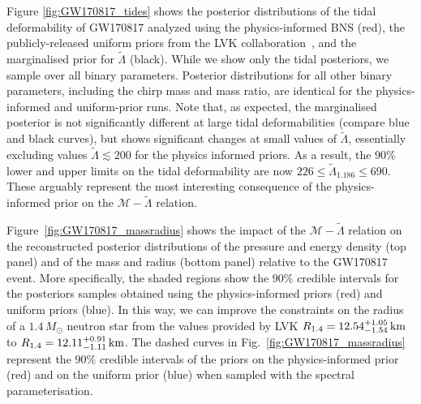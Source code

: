 \documentclass[twocolumn,linenumbers]{aastex631}
\begin{document}
Figure \ref{fig:GW170817_tides} shows the posterior distributions of the
tidal deformability of GW170817 analyzed using the physics-informed BNS
(red), the publicly-released uniform priors from the LVK
collaboration~\citep[blue;][]{abbott17_170817observation}, and the
marginalised prior for $\tilde{\Lambda}$ (black). While we show only the
tidal posteriors, we sample over all binary parameters. Posterior
distributions for all other binary parameters, including the chirp mass
and mass ratio, are identical for the physics-informed and uniform-prior
runs.  Note that, as expected, the marginalised posterior is not
significantly different at large tidal deformabilities (compare blue and
black curves), but shows significant changes at small values of
$\tilde{\Lambda}$, essentially excluding values $\tilde{\Lambda} \lesssim
200$ for the physics informed priors. As a result, the $90\%$ lower and
upper limits on the tidal deformability are now $226 \leq
\tilde{\Lambda}_{1.186} \leq 690$. These arguably represent the most
interesting consequence of the physics-informed prior on the
$\mathcal{M}\!-\!\tilde{\Lambda}$ relation.


Figure~\ref{fig:GW170817_massradius} shows the impact of the
$\mathcal{M}\!-\!\tilde{\Lambda}$ relation on the reconstructed posterior
distributions of the pressure and energy density (top panel) and of the
mass and radius (bottom panel) relative to the GW170817 event. More
specifically, the shaded regions show the $90\%$ credible intervals for
the posteriors samples obtained using the physics-informed priors (red)
and uniform priors (blue). In this way, we can improve the constraints on
the radius of a $1.4\,M_\odot$ neutron star from the values provided by
LVK $R_{1.4} = {12.54^{+1.05}_{-1.54}}\,{\rm km}$ to $R_{1.4} =
12.11^{+0.91}_{-1.11}\,{\rm km}$. The dashed curves in
Fig.~\ref{fig:GW170817_massradius} represent the $90\%$ credible
intervals of the priors on the physics-informed prior (red) and on the
uniform prior (blue) when sampled with the spectral parameterisation.
\end{document}
